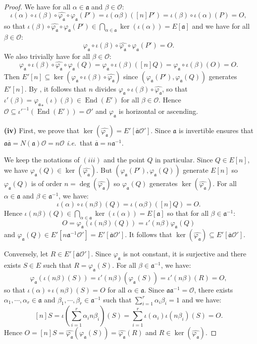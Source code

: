 \documentclass[a4paper,10pt]{report}
\theoremstyle{definition}
\theoremstyle{plain}
\theoremstyle{definition}
\newcommand{\ie}{\emph{i.e.}\ }
\newcommand{\mO}{\mathcal{O}}
\renewcommand{\(}{\left(}
\renewcommand{\)}{\right)}
\newcommand{\mf}[1]{\mathfrak{#1}}
\DeclareMathOperator{\End}{End}
\begin{document}
\begin{proof}
We have for all $\alpha\in \mf{a}$ and $\beta\in\mO$:
\[\iota(\alpha)\circ\iota(\beta)\circ\widehat{\varphi_{\mf{a}}}\circ\varphi_{\mf{a}}(P')=\iota(\alpha\beta)([n]P')=\iota(\beta)\circ\iota(\alpha)(P)=O,\]
so that $\iota(\beta)\circ\widehat{\varphi_{\mf{a}}}\circ\varphi_{\mf{a}}(P')\in\bigcap_{\alpha\in\mf{a}}\ker(\iota(\alpha))=E[\mf{a}]$ and we have for all $\beta\in\mO$:
\[\varphi_{\mf{a}}\circ\iota(\beta)\circ\widehat{\varphi_{\mf{a}}}\circ\varphi_{\mf{a}}(P')=O.\]
We also trivially have for all $\beta\in\mO$:
\[\varphi_{\mf{a}}\circ\iota(\beta)\circ\widehat{\varphi_{\mf{a}}}\circ\varphi_{\mf{a}}(Q)=\varphi_{\mf{a}}\circ\iota(\beta)([n]Q)=\varphi_{\mf{a}}\circ\iota(\beta)(O)=O.\]
Then $E'[n]\subseteq \ker(\varphi_{\mf{a}}\circ\iota(\beta)\circ\widehat{\varphi_{\mf{a}}})$ since $(\varphi_{\mf{a}}(P'),\varphi_{\mf{a}}(Q))$ generates $E'[n]$.  By \cite[Corollary III.4.11]{Silverman1}, it follows that $n$ divides $\varphi_{\mf{a}}\circ\iota(\beta)\circ\widehat{\varphi_{\mf{a}}}$, so that $\iota'(\beta)={\varphi_{\mf{a}}}_*(\iota)(\beta)\in\End(E')$ for all $\beta\in\mO$. Hence $\mO\subseteq\iota'^{-1}(\End(E'))=\mO'$ and $\varphi_{\mf{a}}$ is horizontal or ascending.

\textbf{(iv)} First, we prove that $\ker(\widehat{\varphi_{\mf{a}}})=E'[\overline{\mf{a}}\mO']$. Since $\mf{a}$ is invertible \cite[Lemma 7.14.(iii)]{Cox} ensures that $\mf{a}\overline{\mf{a}}=N(\mf{a})\mO=n\mO$ \ie that $\overline{\mf{a}}=n\mf{a}^{-1}$. 

We keep the notations of $(iii)$ and the point $Q$ in particular. Since $Q\in E[n]$, we have $\varphi_{\mf{a}}(Q)\in\ker(\widehat{\varphi_{\mf{a}}})$. But $(\varphi_{\mf{a}}(P'),\varphi_{\mf{a}}(Q))$ generate $E[n]$ so $\varphi_{\mf{a}}(Q)$ is of order $n=\deg(\widehat{\varphi_{\mf{a}}})$ so $\varphi_{\mf{a}}(Q)$ generates $\ker(\widehat{\varphi_{\mf{a}}})$.  For all $\alpha\in\mf{a}$ and $\beta\in\mf{a}^{-1}$, we have:
\[\iota(\alpha)\circ\iota(n\beta)(Q)=\iota(\alpha \beta)([n]Q)=O.\]
Hence $\iota(n\beta)(Q)\in\bigcap_{\alpha\in\mf{a}}\ker(\iota(\alpha))=E[\mf{a}]$ so that for all $\beta\in\mf{a}^{-1}$:
\[O=\varphi_{\mf{a}}(\iota(n\beta)(Q))=\iota'(n\beta)\varphi_{\mf{a}}(Q)\]
and $\varphi_{\mf{a}}(Q)\in E'[n\mf{a}^{-1}\mO']=E'[\overline{\mf{a}}\mO']$. It follows that $\ker(\widehat{\varphi_{\mf{a}}})\subseteq E'[\overline{\mf{a}}\mO']$. 


Conversely, let $R\in E'[\overline{\mf{a}}\mO']$. Since $\varphi_{\mf{a}}$ is not constant, it is surjective and there exists $S\in E$ such that $R=\varphi_{\mf{a}}(S)$. For all $\beta\in\mf{a}^{-1}$, we have:
\[\varphi_{\mf{a}}(\iota(n\beta)(S))=\iota'(n\beta)(\varphi_{\mf{a}}(S))=\iota'(n\beta)(R)=O,\]
so that $\iota(\alpha)\circ \iota(n\beta)(S)=O$ for all $\alpha\in \mf{a}$. Since $\mf{a}\mf{a}^{-1}=\mO$, there exists $\alpha_1, \cdots, \alpha_r\in\mf{a}$ and $\beta_1, \cdots, \beta_r\in\mf{a}^{-1}$ such that $\sum_{i=1}^r \alpha_i\beta_i=1$ and we have:
\[[n]S=\iota\(\sum_{i=1}^r \alpha_i n\beta_i\)(S)=\sum_{i=1}^r\iota(\alpha_i)\iota(n\beta_i)(S)=O.\]
Hence $O=[n]S=\widehat{\varphi_{\mf{a}}}(\varphi_{\mf{a}}(S))=\widehat{\varphi_{\mf{a}}}(R)$ and $R\in\ker(\widehat{\varphi_{\mf{a}}})$. 


\end{proof}
\end{document}
